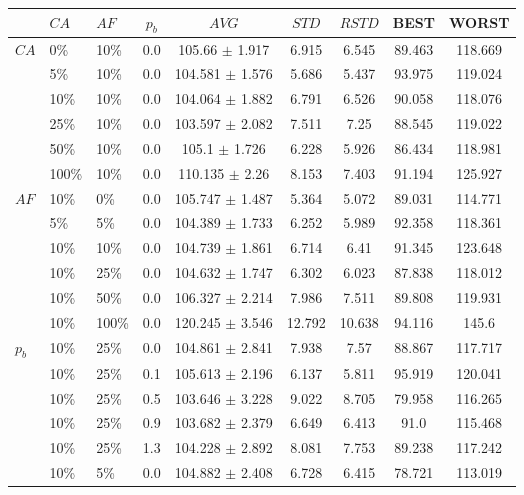 \begin{sidewaystable}
    \centering
    \begin{tabular}{|l|l|l|c||c|c|c|c|c|}
    \hline
    ~ & $CA$ & $AF$ & $p_b$ & $AVG$ & $STD$ & $RSTD$ & BEST & WORST \\
    \hline
    $CA$ & 0\% & 10\% & 0.0 & 105.66 $\pm$ 1.917 & 6.915 & 6.545 & 89.463 & 118.669\\
    ~ & 5\% & 10\% & 0.0 & 104.581 $\pm$ 1.576 & 5.686 & 5.437 & 93.975 & 119.024\\
    ~ & 10\% & 10\% & 0.0 & 104.064 $\pm$ 1.882 & 6.791 & 6.526 & 90.058 & 118.076\\
    ~ & 25\% & 10\% & 0.0 & 103.597 $\pm$ 2.082 & 7.511 & 7.25 & 88.545 & 119.022\\
    ~ & 50\% & 10\% & 0.0 & 105.1 $\pm$ 1.726 & 6.228 & 5.926 & 86.434 & 118.981\\
    ~ & 100\% & 10\% & 0.0 & 110.135 $\pm$ 2.26 & 8.153 & 7.403 & 91.194 & 125.927\\
    \hline
    $AF$ & 10\% & 0\% & 0.0 & 105.747 $\pm$ 1.487 & 5.364 & 5.072 & 89.031 & 114.771\\
    ~ & 5\% & 5\% & 0.0 & 104.389 $\pm$ 1.733 & 6.252 & 5.989 & 92.358 & 118.361\\
    ~ & 10\% & 10\% & 0.0 & 104.739 $\pm$ 1.861 & 6.714 & 6.41 & 91.345 & 123.648\\
    ~ & 10\% & 25\% & 0.0 & 104.632 $\pm$ 1.747 & 6.302 & 6.023 & 87.838 & 118.012\\
    ~ & 10\% & 50\% & 0.0 & 106.327 $\pm$ 2.214 & 7.986 & 7.511 & 89.808 & 119.931\\
    ~ & 10\% & 100\% & 0.0 & 120.245 $\pm$ 3.546 & 12.792 & 10.638 & 94.116 & 145.6\\
    \hline
    $p_b$ & 10\% & 25\% & 0.0 & 104.861 $\pm$ 2.841 & 7.938 & 7.57 & 88.867 & 117.717\\
    ~ & 10\% & 25\% & 0.1 & 105.613 $\pm$ 2.196 & 6.137 & 5.811 & 95.919 & 120.041\\
    ~ & 10\% & 25\% & 0.5 & 103.646 $\pm$ 3.228 & 9.022 & 8.705 & 79.958 & 116.265\\
    ~ & 10\% & 25\% & 0.9 & 103.682 $\pm$ 2.379 & 6.649 & 6.413 & 91.0 & 115.468\\
    ~ & 10\% & 25\% & 1.3 & 104.228 $\pm$ 2.892 & 8.081 & 7.753 & 89.238 & 117.242\\
    \hline
    ~ & 10\% & 5\% & 0.0 & 104.882 $\pm$ 2.408 & 6.728 & 6.415 & 78.721 & 113.019\\

\end{tabular}
\end{sidewaystable}
